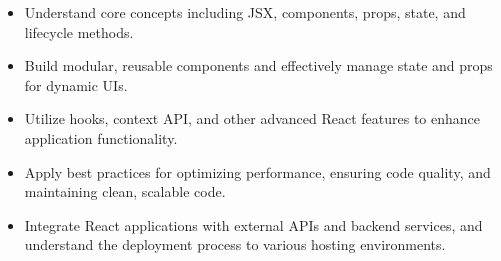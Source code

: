 \begin{itemize}
    \item Understand core concepts including JSX, components, props, state, and lifecycle methods.
    \item Build modular, reusable components and effectively manage state and props for dynamic UIs.
    \item Utilize hooks, context API, and other advanced React features to enhance application functionality.
    \item Apply best practices for optimizing performance, ensuring code quality, and maintaining clean, scalable code.
    \item Integrate React applications with external APIs and backend services, and understand the deployment process to various hosting environments.
\end{itemize}
